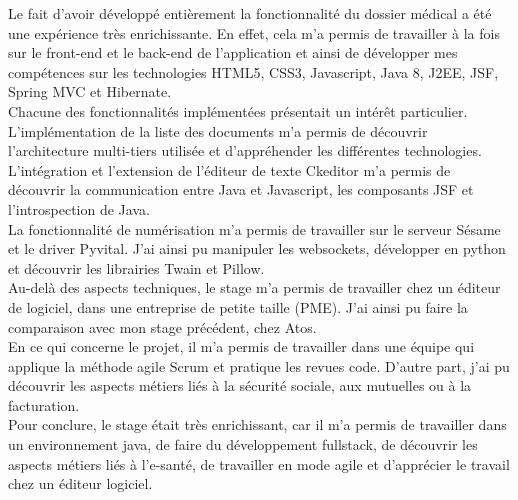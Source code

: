Le fait d'avoir développé entièrement la fonctionnalité du dossier médical a été une expérience très enrichissante. En effet, cela m'a permis de travailler à la fois sur le front-end et le back-end de l'application et ainsi de développer mes compétences sur les technologies HTML5, CSS3, Javascript, Java 8, J2EE, JSF, Spring MVC et Hibernate. \\
Chacune des fonctionnalités implémentées présentait un intérêt particulier.\\
L'implémentation de la liste des documents m'a permis de découvrir l'architecture multi-tiers utilisée et d'appréhender les différentes technologies.\\ L'intégration et l'extension de l'éditeur de texte Ckeditor m'a permis de découvrir la communication entre Java et Javascript, les composants JSF et l'introspection de Java.\\
La fonctionnalité de numérisation m'a permis de travailler sur le serveur Sésame et le driver Pyvital. J'ai ainsi pu manipuler les websockets, développer en python et découvrir les librairies Twain et Pillow.\\

Au-delà des aspects techniques, le stage m'a permis de travailler chez un éditeur de logiciel, dans une entreprise de petite taille (PME). J'ai ainsi pu faire la comparaison avec mon stage précédent, chez Atos.\\
En ce qui concerne le projet, il m'a permis de travailler dans une équipe qui applique la méthode agile Scrum et pratique les revues code. D'autre part, j'ai pu découvrir les aspects métiers liés à la sécurité sociale, aux mutuelles ou à la facturation.\\

Pour conclure, le stage était très enrichissant, car il m'a permis de travailler dans un environnement java, de faire du développement fullstack, de découvrir les aspects métiers liés à l'e-santé, de travailler en mode agile et d'apprécier le travail chez un éditeur logiciel.




